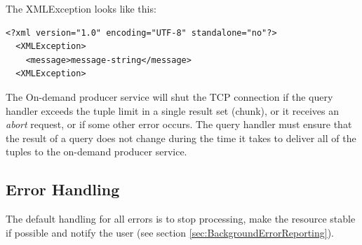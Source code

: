 The XMLException looks like this:

\begin{verbatim}
<?xml version="1.0" encoding="UTF-8" standalone="no"?>
  <XMLException>
    <message>message-string</message>
  <XMLException>
\end{verbatim}

The On-demand producer service will shut the TCP connection if the query
handler exceeds the tuple limit in a single result set (chunk), or
it receives an \textit{abort} request, or if some other error occurs. The
query handler must ensure that the result of a query does not change during
the time it takes to deliver all of the tuples to the on-demand producer
service.

\subsection{Error Handling}

The default handling for all errors is to stop processing, make the resource
stable if possible and notify the user
(see section \ref{sec:BackgroundErrorReporting}).

